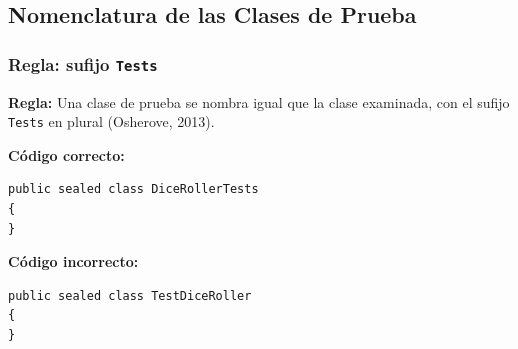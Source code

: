 \subsection{Nomenclatura de las Clases de Prueba}

\subsubsection{Regla: sufijo \texttt{Tests}}

\textbf{Regla:} Una clase de prueba se nombra igual que la clase examinada, con el sufijo \texttt{Tests} en plural (Osherove, 2013).

\textbf{Código correcto:}
\begin{lstlisting}[style=csharpstyle]
public sealed class DiceRollerTests
{
}
\end{lstlisting}

\textbf{Código incorrecto:}
\begin{lstlisting}[style=csharpstyle]
public sealed class TestDiceRoller
{
}
\end{lstlisting}
